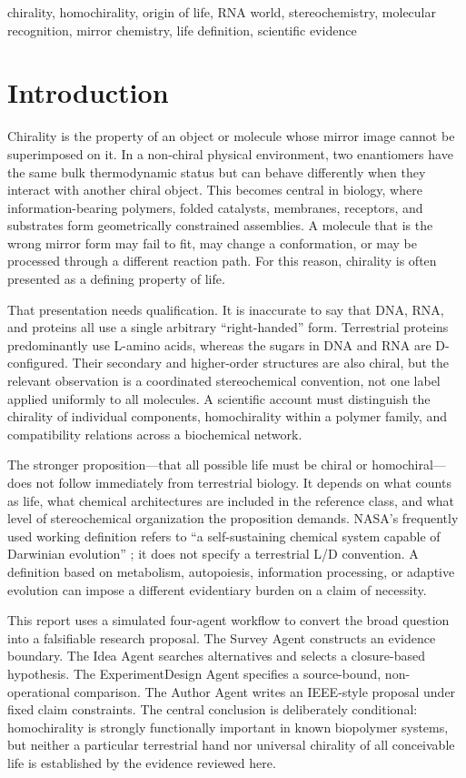 \documentclass[conference]{IEEEtran}
\begin{document}
\begin{IEEEkeywords}
chirality, homochirality, origin of life, RNA world, stereochemistry, molecular recognition, mirror chemistry, life definition, scientific evidence
\end{IEEEkeywords}

\section{Introduction}

Chirality is the property of an object or molecule whose mirror image cannot be superimposed on it. In a non-chiral physical environment, two enantiomers have the same bulk thermodynamic status but can behave differently when they interact with another chiral object. This becomes central in biology, where information-bearing polymers, folded catalysts, membranes, receptors, and substrates form geometrically constrained assemblies. A molecule that is the wrong mirror form may fail to fit, may change a conformation, or may be processed through a different reaction path. For this reason, chirality is often presented as a defining property of life.

That presentation needs qualification. It is inaccurate to say that DNA, RNA, and proteins all use a single arbitrary ``right-handed'' form. Terrestrial proteins predominantly use L-amino acids, whereas the sugars in DNA and RNA are D-configured. Their secondary and higher-order structures are also chiral, but the relevant observation is a coordinated stereochemical convention, not one label applied uniformly to all molecules. A scientific account must distinguish the chirality of individual components, homochirality within a polymer family, and compatibility relations across a biochemical network.

The stronger proposition---that all possible life must be chiral or homochiral---does not follow immediately from terrestrial biology. It depends on what counts as life, what chemical architectures are included in the reference class, and what level of stereochemical organization the proposition demands. NASA's frequently used working definition refers to ``a self-sustaining chemical system capable of Darwinian evolution'' \cite{nasa}; it does not specify a terrestrial L/D convention. A definition based on metabolism, autopoiesis, information processing, or adaptive evolution can impose a different evidentiary burden on a claim of necessity.

This report uses a simulated four-agent workflow to convert the broad question into a falsifiable research proposal. The Survey Agent constructs an evidence boundary. The Idea Agent searches alternatives and selects a closure-based hypothesis. The ExperimentDesign Agent specifies a source-bound, non-operational comparison. The Author Agent writes an IEEE-style proposal under fixed claim constraints. The central conclusion is deliberately conditional: homochirality is strongly functionally important in known biopolymer systems, but neither a particular terrestrial hand nor universal chirality of all conceivable life is established by the evidence reviewed here.
\end{document}
